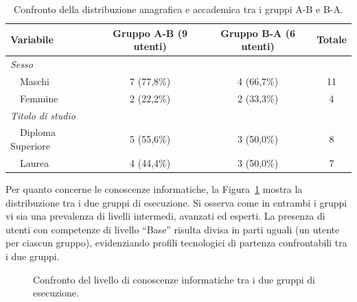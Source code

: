 \begin{table}[H]
	\centering
	\small
	\renewcommand{\arraystretch}{1.2}
	\caption{Confronto della distribuzione anagrafica e accademica tra i gruppi A-B e B-A.}
	\label{tab:6-1}
	\begin{tabular}{|l|c|c|c|}
		\hline
		\rowcolor{gray!30}
		\textbf{Variabile}        & \textbf{Gruppo A-B (9 utenti)} & \textbf{Gruppo B-A (6 utenti)} & \textbf{Totale} \\ \hline
		\textit{Sesso}            &                                &                                &                 \\ \hline
		~~Maschi                  & 7 (77,8\%)                     & 4 (66,7\%)                     & 11              \\ \hline
		~~Femmine                 & 2 (22,2\%)                     & 2 (33,3\%)                     & 4               \\ \hline
		\textit{Titolo di studio} &                                &                                &                 \\ \hline
		~~Diploma Superiore       & 5 (55,6\%)                     & 3 (50,0\%)                     & 8               \\ \hline
		~~Laurea                  & 4 (44,4\%)                     & 3 (50,0\%)                     & 7               \\ \hline
	\end{tabular}
\end{table}

Per quanto concerne le conoscenze informatiche, la Figura~\ref{fig:6-7} mostra la distribuzione tra i due gruppi di esecuzione. Si osserva come in entrambi i gruppi vi sia una prevalenza di livelli intermedi, avanzati ed esperti. La presenza di utenti con competenze di livello ``Base'' risulta divisa in parti uguali (un utente per ciascun gruppo), evidenziando profili tecnologici di partenza confrontabili tra i due gruppi.

\begin{figure}[H]
	\centering
	\caption{Confronto del livello di conoscenze informatiche tra i due gruppi di esecuzione.}
	\label{fig:6-7}
\end{figure}


